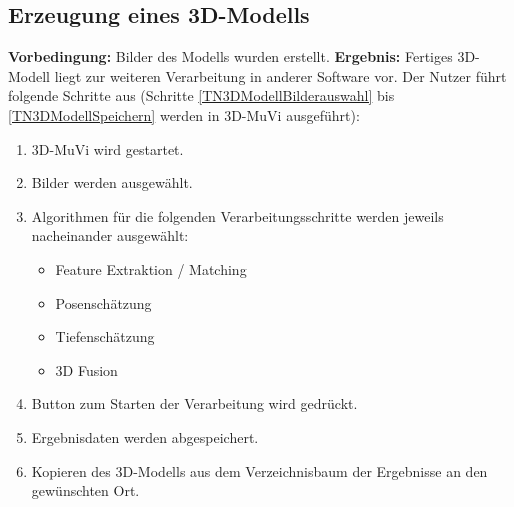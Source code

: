 \subsection{Erzeugung eines 3D-Modells}
\textbf{Vorbedingung:} Bilder des Modells wurden erstellt. \newline
\textbf{Ergebnis:} Fertiges 3D-Modell liegt zur weiteren Verarbeitung in anderer Software vor. \newline
Der Nutzer führt folgende Schritte aus (Schritte \ref{TN3DModellBilderauswahl} bis \ref{TN3DModellSpeichern} werden in 3D-MuVi ausgeführt):
\begin{enumerate}
	\item 3D-MuVi wird gestartet.
	\item \label{TN3DModellBilderauswahl} Bilder werden ausgewählt.
	\item Algorithmen für die folgenden Verarbeitungsschritte werden jeweils nacheinander ausgewählt:
	\begin{itemize}
		\item Feature Extraktion / Matching
		\item Posenschätzung
		\item Tiefenschätzung
		\item 3D Fusion
	\end{itemize}
	\item Button zum Starten der Verarbeitung wird gedrückt.
	\item \label{TN3DModellSpeichern} Ergebnisdaten werden abgespeichert.
	\item Kopieren des 3D-Modells aus dem Verzeichnisbaum der Ergebnisse an den gewünschten Ort.
\end{enumerate}

